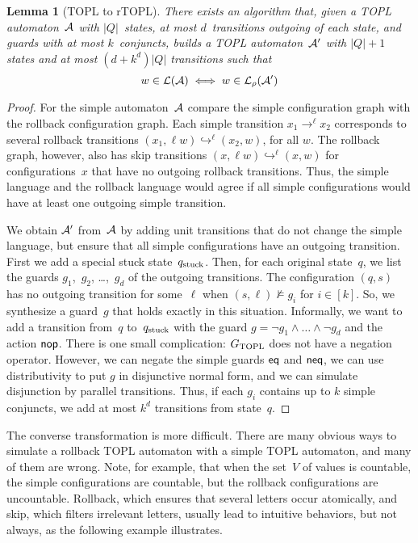 \documentclass[9pt, preprint]{sigplanconf} %
\newtheorem{lemma}{Lemma}
\theoremstyle{definition}
\theoremstyle{remark}
\begin{document}
\begin{lemma}[TOPL to rTOPL]\label{lemma:topl-to-rtopl}
There exists an algorithm that, given a TOPL automaton~${\cal A}$ with $|Q|$~states, at most $d$~transitions outgoing of each state, and guards with at most $k$~conjuncts, builds a TOPL automaton~${\cal A}'$ with $|Q|+1$ states and at most $(d+k^d)|Q|$ transitions such that
\[ w\in{\cal L}({\cal A}) \iff w\in{\cal L}_\rho({\cal A}')\]
\end{lemma}
\begin{proof}
For the simple automaton~${\cal A}$ compare the simple configuration graph with the rollback configuration graph.
Each simple transition $x_1\to^\ell x_2$ corresponds to several rollback transitions $ (x_1,\ell w)\hookrightarrow^\ell (x_2,w)$, for all $w$.
The rollback graph, however, also has skip transitions $(x,\ell w)\hookrightarrow^\ell (x,w)$ for configurations~$x$ that have no outgoing rollback transitions.
Thus, the simple language and the rollback language would agree if all simple configurations would have at least one outgoing simple transition.

We obtain ${\cal A}'$ from~${\cal A}$ by adding unit transitions that do not change the simple language, but ensure that all simple configurations have an outgoing transition.
First we add a special stuck state~$q_{\rm stuck}$.
Then, for each original state~$q$, we list the guards $g_1$,~$g_2$, \dots,~$g_d$ of the outgoing transitions.
The configuration $(q,s)$ has no outgoing transition for some~$\ell$ when $(s,\ell)\not\models g_i$ for $i\in[k]$.
So, we synthesize a guard~$g$ that holds exactly in this situation.
Informally, we want to add a transition from~$q$ to~$q_{\rm stuck}$ with the guard $g=\lnot g_1\land\ldots\land\lnot g_d$ and the action ${\sf nop}$.
There is one small complication: $G_{\rm TOPL}$ does not have a negation operator.
However, we can negate the simple guards ${\sf eq}$ and ${\sf neq}$, we can use distributivity to put $g$ in disjunctive normal form, and we can simulate disjunction by parallel transitions.
Thus, if each $g_i$ contains up to $k$ simple conjuncts, we add at most $k^d$ transitions from state~$q$.
\end{proof}

The converse transformation is more difficult.
There are many obvious ways to simulate a rollback TOPL automaton with a simple TOPL automaton, and many of them are wrong.
Note, for example, that when the set~$V$ of values is countable, the simple configurations are countable, but the rollback configurations are uncountable.
Rollback, which ensures that several letters occur atomically, and skip, which filters irrelevant letters, usually lead to intuitive behaviors, but not always, as the following example illustrates.
\end{document}
